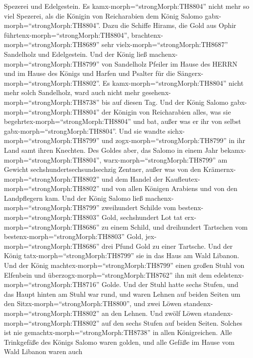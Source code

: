 Spezerei und Edelgestein. Es kamx-morph=``strongMorph:TH8804'' nicht
mehr so viel Spezerei, als die Königin von Reicharabien dem König Salomo
gabx-morph=``strongMorph:TH8804''.  Dazu die Schiffe
Hirams, die Gold aus Ophir führtenx-morph=``strongMorph:TH8804'',
brachtenx-morph=``strongMorph:TH8689'' sehr
vielx-morph=``strongMorph:TH8687'' Sandelholz und Edelgestein.
 Und der König ließ machenx-morph=``strongMorph:TH8799''
von Sandelholz Pfeiler im Hause des HERRN und im Hause des Königs und
Harfen und Psalter für die Sängerx-morph=``strongMorph:TH8802''. Es
kamx-morph=``strongMorph:TH8804'' nicht mehr solch Sandelholz, ward auch
nicht mehr gesehenx-morph=``strongMorph:TH8738'' bis auf diesen Tag.
 Und der König Salomo gabx-morph=``strongMorph:TH8804'' der
Königin von Reicharabien alles, was sie
begehrtex-morph=``strongMorph:TH8804'' und bat, außer was er ihr von
selbst gabx-morph=``strongMorph:TH8804''. Und sie wandte
sichx-morph=``strongMorph:TH8799'' und zogx-morph=``strongMorph:TH8799''
in ihr Land samt ihren Knechten.  Des Goldes aber, das
Salomo in einem Jahr bekamx-morph=``strongMorph:TH8804'',
warx-morph=``strongMorph:TH8799'' am Gewicht sechshundertsechsundsechzig
Zentner,  außer was von den
Krämernx-morph=``strongMorph:TH8802'' und dem Handel der
Kaufleutex-morph=``strongMorph:TH8802'' und von allen Königen Arabiens
und von den Landpflegern kam.  Und der König Salomo ließ
machenx-morph=``strongMorph:TH8799'' zweihundert Schilde vom
bestenx-morph=``strongMorph:TH8803'' Gold, sechshundert Lot tat
erx-morph=``strongMorph:TH8686'' zu einem Schild,  und
dreihundert Tartschen vom bestenx-morph=``strongMorph:TH8803'' Gold,
jex-morph=``strongMorph:TH8686'' drei Pfund Gold zu einer Tartsche. Und
der König tatx-morph=``strongMorph:TH8799'' sie in das Haus am Wald
Libanon.  Und der König
machtex-morph=``strongMorph:TH8799'' einen großen Stuhl von Elfenbein
und überzogx-morph=``strongMorph:TH8762'' ihn mit dem
edelstenx-morph=``strongMorph:TH8716'' Golde.  Und der
Stuhl hatte sechs Stufen, und das Haupt hinten am Stuhl war rund, und
waren Lehnen auf beiden Seiten um den
Sitzx-morph=``strongMorph:TH8800'', und zwei Löwen
standenx-morph=``strongMorph:TH8802'' an den Lehnen.  Und
zwölf Löwen standenx-morph=``strongMorph:TH8802'' auf den sechs Stufen
auf beiden Seiten. Solches ist nie gemachtx-morph=``strongMorph:TH8738''
in allen Königreichen.  Alle Trinkgefäße des Königs Salomo
waren golden, und alle Gefäße im Hause vom Wald Libanon waren auch
